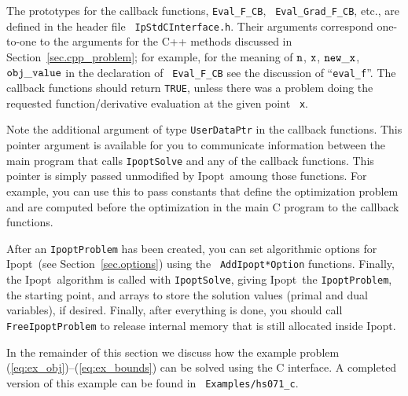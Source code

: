 \documentclass[letter,10pt]{article}
\newcommand{\Ipopt}{{\sc Ipopt}}
\begin{document}
The prototypes for the callback functions, {\tt Eval\_F\_CB}, {\tt
  Eval\_Grad\_F\_CB}, etc., are defined in the header file {\tt
  IpStdCInterface.h}.  Their arguments correspond one-to-one to the
arguments for the C++ methods discussed in
Section~\ref{sec.cpp_problem}; for example, for the meaning of $\tt
n$, $\tt x$, $\tt new\_x$, $\tt obj\_value$ in the declaration of {\tt
  Eval\_F\_CB} see the discussion of ``{\tt eval\_f}''.  The callback
functions should return {\tt TRUE}, unless there was a problem doing
the requested function/derivative evaluation at the given point {\tt
  x}.

Note the additional argument of type {\tt UserDataPtr} in the callback
functions.  This pointer argument is available for you to communicate
information between the main program that calls {\tt IpoptSolve} and
any of the callback functions.  This pointer is simply passed
unmodified by \Ipopt\ amoung those functions.  For example, you can
use this to pass constants that define the optimization problem and
are computed before the optimization in the main C program to the
callback functions.

After an {\tt IpoptProblem} has been created, you can set algorithmic
options for \Ipopt\ (see Section~\ref{sec.options}) using the {\tt
  AddIpopt*Option} functions.  Finally, the \Ipopt\ algorithm is
called with {\tt IpoptSolve}, giving \Ipopt\ the {\tt IpoptProblem},
the starting point, and arrays to store the solution values (primal
and dual variables), if desired.  Finally, after everything is done,
you should call {\tt FreeIpoptProblem} to release internal memory that
is still allocated inside \Ipopt.

In the remainder of this section we discuss how the example problem
(\ref{eq:ex_obj})--(\ref{eq:ex_bounds}) can be solved using the C
interface.  A completed version of this example can be found in {\tt
  Examples/hs071\_c}.

\end{document}
